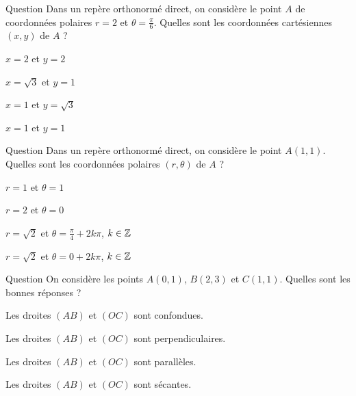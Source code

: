 \begin{multi}[multiple,feedback=
{Les deux systèmes de coordonnées sont reliés par les relations \(x=r\cos \theta\) et \(y=r\sin \theta \).
}]{Question}
Dans un repère orthonormé direct, on considère le point \(A\) de coordonnées polaires \(r=2\) et \(\displaystyle \theta =\frac{\pi}{6}\). Quelles sont les coordonnées cartésiennes \((x,y)\) de \(A\) ?

    \item \(x=2\) et \(y=2\)
    \item* \(x=\sqrt{3}\) et \(y=1\)
    \item \(x=1\) et \(y=\sqrt{3}\)
    \item \(x=1\) et \(y=1\)
\end{multi}


\begin{multi}[multiple,feedback=
{D'abord, \(r=\sqrt{1^2+1^2}=\sqrt{2}\) et \(\theta \) est solution du système : 
\[\left\{\begin{array}{l}\displaystyle \cos \theta =\frac{1}{\sqrt{2}}\\ \\ \displaystyle \sin \theta =\frac{1}{\sqrt{2}}.\end{array}\right.\]
}]{Question}
Dans un repère orthonormé direct, on considère le point \(A(1,1)\). Quelles sont les coordonnées polaires \((r,\theta)\) de \(A\) ?

    \item \(r=1\) et \(\theta =1\)
    \item \(r=2\) et \(\theta =0\)
    \item* \(r=\sqrt{2}\) et \(\displaystyle \theta =\frac{\pi}{4}+2k\pi\), \(k\in \mathbb{Z}\)
    \item \(r=\sqrt{2}\) et \(\theta =0+2k\pi\), \(k\in \mathbb{Z}\)
\end{multi}


\begin{multi}[multiple,feedback=
{On a \(\overrightarrow{AB}=(2,2)=2\overrightarrow{OC}\). Les droites \((AB)\) et \((OC)\) sont parallèles.
}]{Question}
On considère les points \(A(0,1)\), \(B(2,3)\) et \(C(1,1)\). Quelles sont les bonnes réponses ?

    \item Les droites \((AB)\) et \((OC)\) sont confondues.
    \item Les droites \((AB)\) et \((OC)\) sont perpendiculaires.
    \item* Les droites \((AB)\) et \((OC)\) sont parallèles.
    \item Les droites \((AB)\) et \((OC)\) sont sécantes.
\end{multi}


